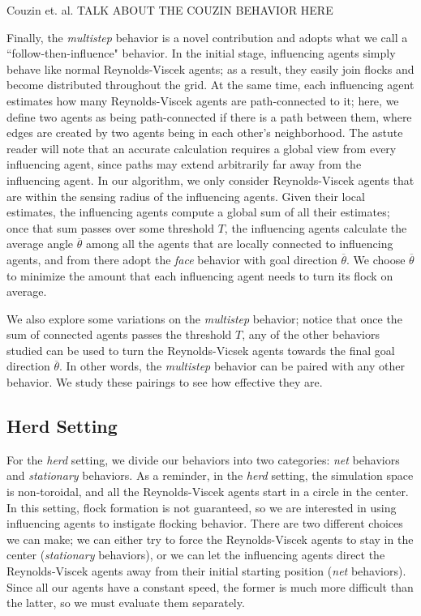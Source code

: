 Couzin et. al. TALK ABOUT THE COUZIN BEHAVIOR HERE

Finally, the \textit{multistep} behavior is a novel contribution and adopts
what we call a ``follow-then-influence" behavior.
In the initial stage, influencing agents simply behave like normal Reynolds-Viscek 
agents; as a result, they easily join flocks and become distributed throughout
the grid.
At the same time, each influencing agent estimates how many Reynolds-Viscek agents
are path-connected to it; here, we define two agents as being path-connected if
there is a path between them, where edges are created by two agents being in
each other's neighborhood.
The astute reader will note that an accurate calculation requires a global view
from every influencing agent, since paths may extend arbitrarily far away from
the influencing agent.
In our algorithm, we only consider Reynolds-Viscek agents that are within the
sensing radius of the influencing agents.
Given their local estimates, the influencing agents compute a global sum of all
their estimates; once that sum passes over some threshold $T$, the influencing
agents calculate the average angle $\overline{\theta}$ among all the agents that
are locally connected to influencing agents, and from there adopt the
\textit{face} behavior with goal direction $\overline{\theta}$.
We choose $\overline{\theta}$ to minimize the amount that each influencing 
agent needs to turn its flock on average.

We also explore some variations on the \textit{multistep} behavior; notice that
once the sum of connected agents passes the threshold $T$, any of the other
behaviors studied can be used to turn the Reynolds-Vicsek agents towards the
final goal direction $\overline{\theta}$.
In other words, the \textit{multistep} behavior can be paired with any other
behavior.
We study these pairings to see how effective they are.

\subsection{Herd Setting}
For the \textit{herd} setting, we divide our behaviors into two categories:
\textit{net} behaviors and \textit{stationary} behaviors.
As a reminder, in the \textit{herd} setting, the simulation space is
non-toroidal, and all the Reynolds-Viscek agents start in a circle in the
center.
In this setting, flock formation is not guaranteed, so we are interested in
using influencing agents to instigate flocking behavior.
There are two different choices we can make; we can either try to force the
Reynolds-Viscek agents to stay in the center (\textit{stationary} behaviors),
or we can let the influencing agents direct the Reynolds-Viscek agents away
from their initial starting position (\textit{net} behaviors).
Since all our agents have a constant speed, the former is much more difficult
than the latter, so we must evaluate them separately.

